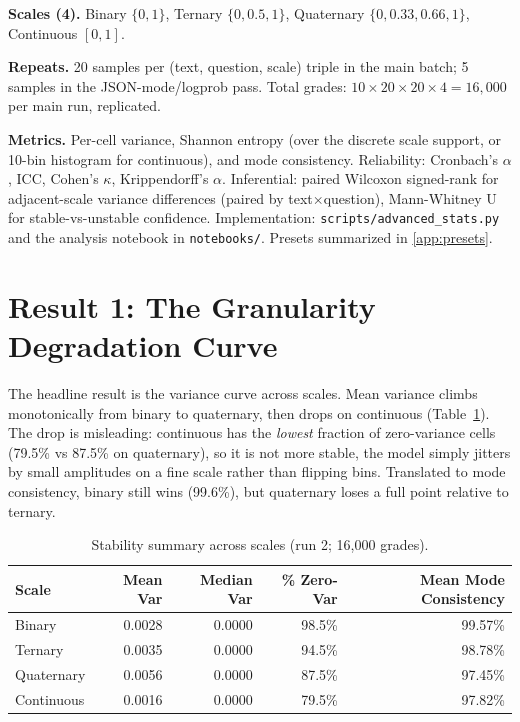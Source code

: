 \documentclass[11pt]{article}
\begin{document}
\textbf{Scales (4).} Binary $\{0,1\}$, Ternary $\{0, 0.5, 1\}$, Quaternary $\{0, 0.33, 0.66, 1\}$, Continuous $[0,1]$.

\textbf{Repeats.} 20 samples per (text, question, scale) triple in the main batch; 5 samples in the JSON-mode/logprob pass. Total grades: $10 \times 20 \times 20 \times 4 = 16{,}000$ per main run, replicated.

\textbf{Metrics.} Per-cell variance, Shannon entropy (over the discrete scale support, or 10-bin histogram for continuous), and mode consistency. Reliability: Cronbach's $\alpha$, ICC, Cohen's $\kappa$, Krippendorff's $\alpha$. Inferential: paired Wilcoxon signed-rank for adjacent-scale variance differences (paired by text$\times$question), Mann-Whitney U for stable-vs-unstable confidence. Implementation: \texttt{scripts/advanced\_stats.py} and the analysis notebook in \texttt{notebooks/}. Presets summarized in \autoref{app:presets}.

\section{Result 1: The Granularity Degradation Curve}
\label{sec:r1}

The headline result is the variance curve across scales. Mean variance climbs monotonically from binary to quaternary, then drops on continuous (Table~\ref{tab:degradation}). The drop is misleading: continuous has the \emph{lowest} fraction of zero-variance cells (79.5\% vs 87.5\% on quaternary), so it is not more stable, the model simply jitters by small amplitudes on a fine scale rather than flipping bins. Translated to mode consistency, binary still wins (99.6\%), but quaternary loses a full point relative to ternary.

\begin{table}[h]
\centering
\small
\caption{Stability summary across scales (run 2; 16{,}000 grades).}
\label{tab:degradation}
\begin{tabular}{lrrrr}
\toprule
\textbf{Scale} & \textbf{Mean Var} & \textbf{Median Var} & \textbf{\% Zero-Var} & \textbf{Mean Mode Consistency} \\
\midrule
Binary       & 0.0028 & 0.0000 & 98.5\% & 99.57\% \\
Ternary      & 0.0035 & 0.0000 & 94.5\% & 98.78\% \\
Quaternary   & 0.0056 & 0.0000 & 87.5\% & 97.45\% \\
Continuous   & 0.0016 & 0.0000 & 79.5\% & 97.82\% \\
\bottomrule
\end{tabular}
\end{table}
\end{document}
